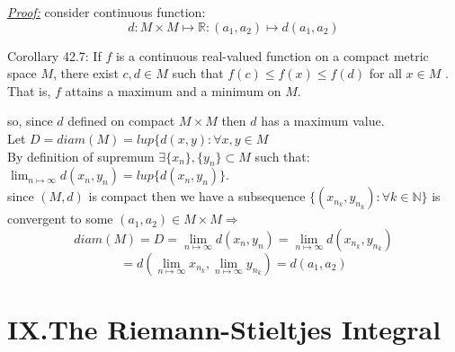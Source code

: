 \documentclass{book}
\begin{document}


\begin{tcolorbox}[enhanced,attach boxed title to top center={yshift=-3mm,yshifttext=-1mm},
colback=blue!5!white,colframe=blue!75!black,colbacktitle=red!80!black,
title=Exercise 43.4:,fonttitle=\bfseries,
boxed title style={size=small,colframe=red!50!black} ]
\textit{\color{blue}\underline{Proof:}}
consider continuous function: 
$$d:M\times M\longmapsto\mathbb{R}:(a_1,a_2)\longmapsto d(a_1,a_2)$$
\begin{tcolorbox}[colback=red!5!white,colframe=red!75!black]
Corollary 42.7: If $f$ is a continuous real-valued function on a compact metric space $M$, there exist $c,d\in 
M$ such that $f(c)\leq f(x)\leq f(d)$ for 
all $x\in M$ . That is, $f$ attains a maximum and a minimum on $M$.
\end{tcolorbox}
so, since $d$ defined on compact $M\times M$ then $d$ has a maximum value.\\
Let $D=diam(M)=lup\{d(x,y):\forall x,y\in M$\\
By definition of supremum $\exists \{x_n\},\{y_n\}\subset M$ such that:\\ $\lim_{n\mapsto\infty}d(x_n,y_n)=lup\{
d(x_n,y_n)\}$.\\
since $(M,d)$ is compact then we have a subsequence $\{(x_{n_k},y_{n_k}):\forall k\in\mathbb{N}\}$ is convergent
to some $(a_1,a_2)\in M\times 
M\Longrightarrow$
$$diam(M)=D=\lim_{n\mapsto\infty}d(x_n,y_n)=\lim_{n\mapsto\infty}d(x_{n_k},y_{n_k})$$
$$=d\left(\lim_{n\mapsto\infty}x_{n_k},\lim_{n\mapsto\infty}y_{n_k}\right)=d(a_1,a_2)$$
\end{tcolorbox}
\chapter{IX.The Riemann-Stieltjes Integral}
\end{document}
